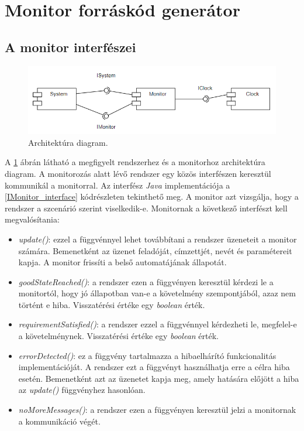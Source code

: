 \section{Monitor forráskód generátor}

\subsection{A monitor interfészei}

\begin{figure}[h!]
    \centering
    \includegraphics[width=130mm, keepaspectratio]{figures/monitor_architecture.png}
    \caption{Architektúra diagram.}
	\label{monitor_architecture}
\end{figure}

A \ref{monitor_architecture} ábrán látható a megfigyelt rendszerhez és a monitorhoz architektúra diagram.
A monitorozás alatt lévő rendszer egy közös interfészen keresztül kommunikál a monitorral.
Az interfész \textit{Java} implementációja a \ref{IMonitor_interface} kódrészleten tekinthető meg.
A monitor azt vizsgálja, hogy a rendszer a szcenárió szerint viselkedik-e.
Monitornak a következő interfészt kell megvalósítania:
\begin{itemize}
    \item \textit{update()}: ezzel a függvénnyel lehet továbbítani a rendszer üzeneteit a monitor számára.
	Bemenetként az üzenet feladóját, címzettjét, nevét és paramétereit kapja.
	A monitor frissíti a belső automatájának állapotát.
    \item \textit{goodStateReached()}: a rendszer ezen a függvényen keresztül kérdezi le a monitortól, hogy jó állapotban van-e a követelmény szempontjából, azaz nem történt e hiba.
    Visszatérési értéke egy \textit{boolean} érték.
    \item \textit{requirementSatisfied()}: a rendszer ezzel a függvénnyel kérdezheti le, megfelel-e a követelménynek.
    Visszatérési értéke egy \textit{boolean} érték.
	\item \textit{errorDetected()}: ez a függvény tartalmazza a hibaelhárító funkcionalitás implementációját.
	A rendszer ezt a függvényt használhatja erre a célra hiba esetén.
	Bemenetként azt az üzenetet kapja meg, amely hatására előjött a hiba az \textit{update()} függvényhez hasonlóan.
    \item \textit{noMoreMessages()}: a rendszer ezen a függvényen keresztül jelzi a monitornak a kommunikáció végét.
\end{itemize}

